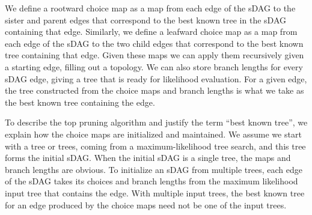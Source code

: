 \documentclass{article}
\begin{document}
We define a rootward choice map as a map from each edge of the sDAG to the sister and parent edges that correspond to the best known tree in the sDAG containing that edge.
Similarly, we define a leafward choice map as a map from each edge of the sDAG to the two child edges that correspond to the best known tree containing that edge.
Given these maps we can apply them recursively given a starting edge, filling out a topology.
We can also store branch lengths for every sDAG edge, giving a tree that is ready for likelihood evaluation.
For a given edge, the tree constructed from the choice maps and branch lengths is what we take as the best known tree containing the edge.

To describe the top pruning algorithm and justify the term ``best known tree'', we explain how the choice maps are initialized and maintained.
We assume we start with a tree or trees, coming from a maximum-likelihood tree search, and this tree forms the initial sDAG.
When the initial sDAG is a single tree, the maps and branch lengths are obvious.
To initialize an sDAG from multiple trees, each edge of the sDAG takes its choices and branch lengths from the maximum likelihood input tree that contains the edge.
With multiple input trees, the best known tree for an edge produced by the choice maps need not be one of the input trees.
\end{document}
